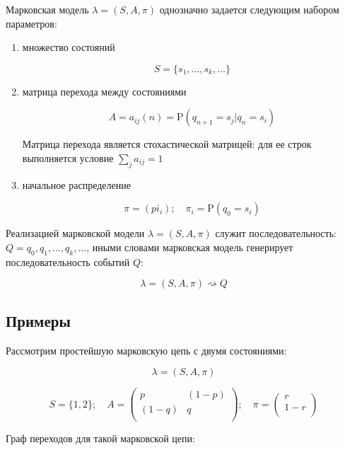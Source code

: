 \documentclass[letterpaper, 11pt]{article}
\newcommand{\prob}{\mathrm{P}}
\begin{document}
Марковская модель $\lambda=(S,A,\pi)$ однозначно задается следующим набором параметров:

\begin{enumerate}

\item множество состояний

$$S=\{s_1,\ldots,s_k,\ldots\}$$

\item матрица перехода между состояниями 

$$A=a_{ij}(n)=\prob(q_{n+1}=s_j|q_{n}=s_i)$$

Матрица перехода является стохастической матрицей: для ее строк выполняется условие $\sum_{j}a_{ij}=1$

\item начальное распределение

$$\pi=(pi_i);\quad\pi_i=\prob(q_0=s_i)$$

\end{enumerate}

Реализацией марковской модели $\lambda=(S,A,\pi)$ служит последовательность:  $Q=q_0,q_1,\ldots,q_k,\ldots$, иными словами марковская модель генерирует последовательность событий $Q$:

$$\lambda=(S,A,\pi) \rightsquigarrow Q$$

\subsection{Примеры}

Рассмотрим простейшую марковскую цепь с двумя состояниями:

$$\lambda=(S,A,\pi)$$

$$S=\{1,2\};
\quad
A=
\begin{pmatrix}
  p & (1-p) \\
  (1-q) & q \\
 \end{pmatrix};
\quad
\pi=
\begin{pmatrix}
  r \\
  1-r \\
 \end{pmatrix}
$$


Граф переходов для такой марковской цепи:

\begin{center}
\end{center}
\end{document}
